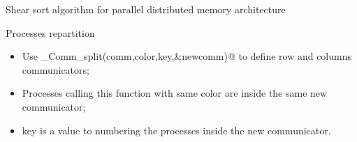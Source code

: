 \documentclass[compress,10pt,aspectratio=169]{beamer}
\begin{document}
\begin{frame}[fragile]{Shear sort algorithm for parallel distributed memory architecture}
\begin{block}{\small Processes repartition}
\begin{multicols}{2}
    \begin{minipage}{0.5\textwidth}
        \begin{itemize}
            \item Use \verb@MPI_Comm_split(comm,color,key,&newcomm)@ to define row and columns communicators;
            \item Processes calling this function with same color are inside the same new communicator;
            \item key is a value to numbering the processes inside the new communicator.
        \end{itemize}
    \end{minipage}
\end{multicols}
    \end{block}
\end{frame}
\end{document}
